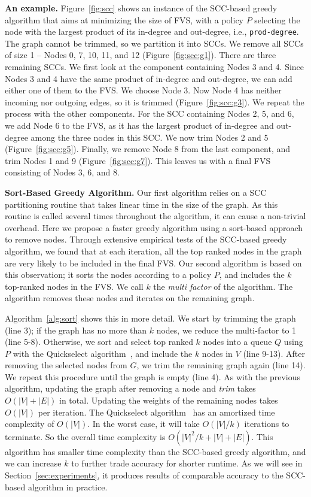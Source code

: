 {\bf An example.} Figure~\ref{fig:scc} shows an instance of the SCC-based greedy algorithm that aims at minimizing the size of FVS, with a policy $P$ selecting the node with the largest product of its in-degree and out-degree, i.e., \texttt{prod-degree}. The graph cannot be trimmed, so we partition it into SCCs. We remove all SCCs of size 1 --  Nodes 0, 7, 10, 11, and 12 (Figure~\ref{fig:scc:g1}). There are three remaining SCCs. We first look at the component containing Nodes 3 and 4. Since Nodes 3 and 4 have the same product of in-degree and out-degree, we can add either one of them to the FVS. We choose Node 3. Now Node 4 has neither incoming nor outgoing edges, so it is trimmed (Figure~\ref{fig:scc:g3}). We repeat the process with the other components. For the SCC containing Nodes 2, 5, and 6, we add Node 6 to the FVS, as it has the largest product of in-degree and out-degree among the three nodes in this SCC. We now trim Nodes 2 and 5 (Figure~\ref{fig:scc:g5}). Finally, we remove Node 8 from the last component, and trim Nodes 1 and 9 (Figure~\ref{fig:scc:g7}). This leaves us with a final FVS consisting of Nodes 3, 6, and 8.

{\bf Sort-Based Greedy Algorithm.} Our first algorithm relies on a SCC partitioning routine that takes linear time in the size of the graph. As this routine is called several times throughout the algorithm, it can cause a non-trivial overhead. Here we propose a faster greedy algorithm using a sort-based approach to remove nodes. Through extensive empirical tests of the SCC-based greedy algorithm, we found that at each iteration, all the top ranked nodes in the graph are very likely to be included in the final FVS. Our second algorithm is based on this observation; it sorts the nodes according to a policy $P$, and includes the $k$ top-ranked nodes in the FVS. We call $k$ the \emph{multi factor} of the algorithm. The algorithm removes these nodes and iterates on the remaining graph.

Algorithm~\ref{alg:sort} shows this in more detail. We start by trimming the graph (line 3); if the graph has no more than $k$ nodes, we reduce the multi-factor to 1 (line 5-8). Otherwise, we sort and select top ranked $k$ nodes into a queue $Q$ using $P$ with the Quickselect algorithm~\cite{hoare61cacm}, and include the $k$ nodes in $V$ (line 9-13).
After removing the selected nodes from $G$, we trim the remaining graph
again (line 14). We repeat this procedure until the graph is empty (line 4). 
As with the previous algorithm, updating the graph after removing a node and \emph{trim} takes $O(|V|+|E|)$ in total. Updating the weights of the remaining nodes takes $O(|V|)$ per iteration. The
Quickselect algorithm~\cite{hoare61cacm} has an amortized time complexity of
$O(|V|)$. In the worst case, it will take $O(|V|/k)$ iterations to terminate. So
the overall time complexity is $O(|V|^2/k + |V| + |E|)$.
This algorithm has smaller time complexity than the SCC-based greedy algorithm, and we can increase $k$ to further trade accuracy for shorter runtime. As we will see in Section~\ref{sec:experiments}, it produces results of comparable accuracy to the SCC-based algorithm in practice.

